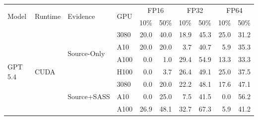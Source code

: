 \begingroup
\scriptsize
\setlength{\tabcolsep}{4pt}
\renewcommand{\arraystretch}{1.0}
\begin{tabular}{@{}llllrrrrrr@{}}
\toprule
\multirow{2}{*}{Model} & \multirow{2}{*}{Runtime} & \multirow{2}{*}{Evidence} & \multirow{2}{*}{GPU} & \multicolumn{2}{c}{FP16} & \multicolumn{2}{c}{FP32} & \multicolumn{2}{c}{FP64} \\
\cmidrule(lr){5-6}\cmidrule(lr){7-8}\cmidrule(lr){9-10}
 &  &  &  & 10\% & 50\% & 10\% & 50\% & 10\% & 50\% \\
\midrule
\multirow{16}{*}{GPT 5.4} & \multirow{8}{*}{CUDA} & \multirow{4}{*}{Source-Only} & 3080 & \cellcolor[rgb]{1.000,0.924,0.924}20.0 & \cellcolor[rgb]{1.000,0.769,0.769}40.0 & \cellcolor[rgb]{1.000,0.930,0.930}18.9 & \cellcolor[rgb]{1.000,0.718,0.718}45.3 & \cellcolor[rgb]{1.000,0.891,0.891}25.0 & \cellcolor[rgb]{1.000,0.845,0.845}31.2 \\
 &  &  & A10 & \cellcolor[rgb]{1.000,0.924,0.924}20.0 & \cellcolor[rgb]{1.000,0.924,0.924}20.0 & \cellcolor[rgb]{1.000,0.995,0.995}3.7 & \cellcolor[rgb]{1.000,0.763,0.763}40.7 & \cellcolor[rgb]{1.000,0.989,0.989}5.9 & \cellcolor[rgb]{1.000,0.811,0.811}35.3 \\
 &  &  & A100 & \cellcolor[rgb]{1.000,1.000,1.000}0.0 & \cellcolor[rgb]{1.000,0.999,0.999}1.0 & \cellcolor[rgb]{1.000,0.859,0.859}29.4 & \cellcolor[rgb]{1.000,0.617,0.617}54.9 & \cellcolor[rgb]{1.000,0.960,0.960}13.3 & \cellcolor[rgb]{1.000,0.828,0.828}33.3 \\
 &  &  & H100 & \cellcolor[rgb]{1.000,1.000,1.000}0.0 & \cellcolor[rgb]{1.000,0.995,0.995}3.7 & \cellcolor[rgb]{1.000,0.881,0.881}26.4 & \cellcolor[rgb]{1.000,0.680,0.680}49.1 & \cellcolor[rgb]{1.000,0.891,0.891}25.0 & \cellcolor[rgb]{1.000,0.792,0.792}37.5 \\
\cmidrule(lr){3-10}
 &  & \multirow{4}{*}{Source+SASS} & 3080 & \cellcolor[rgb]{1.000,1.000,1.000}0.0 & \cellcolor[rgb]{1.000,0.924,0.924}20.0 & \cellcolor[rgb]{1.000,0.910,0.910}22.2 & \cellcolor[rgb]{1.000,0.690,0.690}48.1 & \cellcolor[rgb]{1.000,0.938,0.938}17.6 & \cellcolor[rgb]{1.000,0.700,0.700}47.1 \\
 &  &  & A10 & \cellcolor[rgb]{1.000,1.000,1.000}0.0 & \cellcolor[rgb]{1.000,0.891,0.891}25.0 & \cellcolor[rgb]{1.000,0.984,0.984}7.5 & \cellcolor[rgb]{1.000,0.755,0.755}41.5 & \cellcolor[rgb]{1.000,1.000,1.000}0.0 & \cellcolor[rgb]{1.000,0.602,0.602}56.2 \\
 &  &  & A100 & \cellcolor[rgb]{1.000,0.878,0.878}26.9 & \cellcolor[rgb]{1.000,0.690,0.690}48.1 & \cellcolor[rgb]{1.000,0.833,0.833}32.7 & \cellcolor[rgb]{1.000,0.469,0.469}67.3 & \cellcolor[rgb]{1.000,0.989,0.989}5.9 & \cellcolor[rgb]{1.000,0.758,0.758}41.2 \\

\end{tabular}

